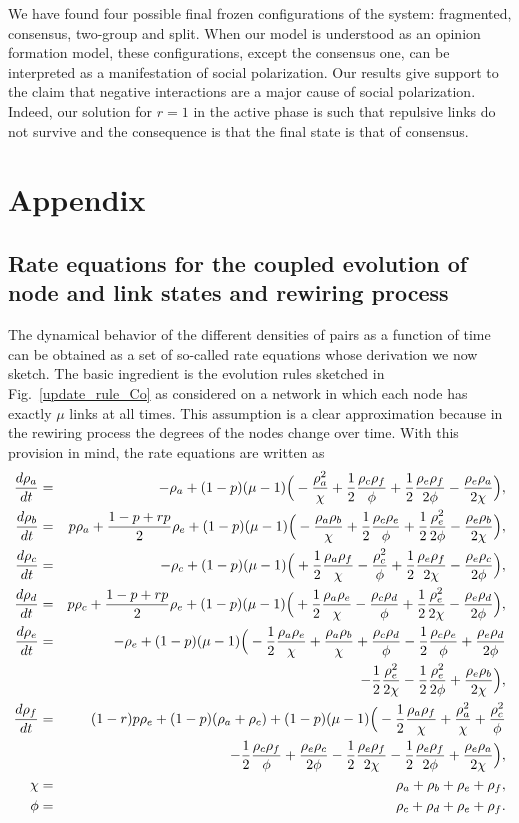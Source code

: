 \documentclass[aps,pre,notitlepage]{revtex4-1}
\begin{document}
We have found four possible final frozen configurations of the system: fragmented, consensus,  two-group and split. When our model is understood as an opinion formation model, these configurations, except the consensus one, can be interpreted as a manifestation of social polarization. Our results give support to the claim that negative interactions are a major cause
of social polarization. Indeed, our solution for $r=1$ in the active phase is such that repulsive
links do not survive and the consequence is that the final state is that of consensus.

\section*{Appendix}
\subsection*{Rate equations for the coupled evolution of node and link states and rewiring process}
The dynamical behavior of the different densities of pairs as a function of time can be obtained as a set of so-called rate equations whose derivation we now sketch. The basic ingredient is the evolution rules sketched in Fig.~\ref{update_rule_Co} as considered on a network in which each node has exactly $\mu$ links at all times. This assumption is a clear approximation because in the rewiring process the degrees of the nodes change over time. With this provision in mind, the rate equations are written as 
\begin{eqnarray}\label{eq:rate}
\frac{d\rho_{a}}{dt}&=&-\rho_{a}+(1-p)(\mu-1)\Big(-\frac{\rho_{a}^{2}}{\chi}+\frac{1}{2}\frac{\rho_{c}\rho_{f}}{\phi}+\frac{1}{2}\frac{\rho_{e}\rho_{f}}{2\phi}-\frac{\rho_{e}\rho_{a}}{2\chi}\Big), \cr
\frac{d\rho_{b}}{dt}&=& p\rho_{a}+\frac{1-p+rp}{2}\rho_{e}+(1-p)(\mu-1)\Big(-\frac{\rho_{a}\rho_{b}}{\chi}+\frac{1}{2}\frac{\rho_{c}\rho_{e}}{\phi}+\frac{1}{2}\frac{\rho_{e}^{2}}{2\phi}-\frac{\rho_{e}\rho_{b}}{2\chi}\Big), \cr
\frac{d\rho_{c}}{dt}&=&-\rho_{c}+(1-p)(\mu-1)\Big(+\frac{1}{2}\frac{\rho_{a}\rho_{f}}{\chi}-\frac{\rho_{c}^{2}}{\phi}+\frac{1}{2}\frac{\rho_{e}\rho_{f}}{2\chi}-\frac{\rho_{e}\rho_{c}}{2\phi}\Big), \cr
\frac{d\rho_{d}}{dt}&=& p\rho_{c}+\frac{1-p+rp}{2}\rho_{e}+(1-p)(\mu-1)\Big(+\frac{1}{2}\frac{\rho_{a}\rho_{e}}{\chi}-\frac{\rho_{c}\rho_{d}}{\phi}+\frac{1}{2}\frac{\rho_{e}^{2}}{2\chi}-\frac{\rho_{e}\rho_{d}}{2\phi}\Big), \cr
\frac{d\rho_{e}}{dt}&=& -\rho_{e}+(1-p)(\mu-1)\Big(-\frac{1}{2}\frac{\rho_{a}\rho_{e}}{\chi}+\frac{\rho_{a}\rho_{b}}{\chi}+\frac{\rho_{c}\rho_{d}}{\phi}-\frac{1}{2}\frac{\rho_{c}\rho_{e}}{\phi}+\frac{\rho_{e}\rho_{d}}{2\phi} \cr
&&-\frac{1}{2}\frac{\rho_{e}^{2}}{2\chi}-\frac{1}{2}\frac{\rho_{e}^{2}}{2\phi}+\frac{\rho_{e}\rho_{b}}{2\chi}\Big), \cr
\frac{d\rho_{f}}{dt}&=&(1-r)p\rho_{e}+(1-p)(\rho_{a}+\rho_{c})+(1-p)(\mu-1)\Big(-\frac{1}{2}\frac{\rho_{a}\rho_{f}}{\chi}+\frac{\rho_{a}^{2}}{\chi}+\frac{\rho_{c}^{2}}{\phi} \cr
&&-\frac{1}{2}\frac{\rho_{c}\rho_{f}}{\phi}+\frac{\rho_{e}\rho_{c}}{2\phi}-\frac{1}{2}\frac{\rho_{e}\rho_{f}}{2\chi}-\frac{1}{2}\frac{\rho_{e}\rho_{f}}{2\phi}+\frac{\rho_{e}\rho_{a}}{2\chi} \Big), \cr
\chi&=&\rho_{a}+\rho_{b}+\rho_{e}+\rho_{f}, \cr
\phi&=&\rho_{c}+\rho_{d}+\rho_{e}+\rho_{f}.
\end{eqnarray}
\end{document}
